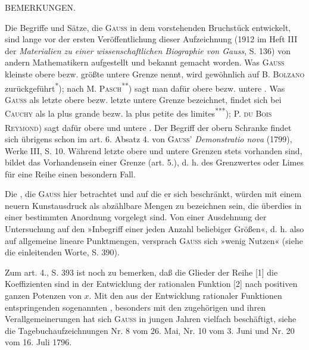 \clearpage{}
\begin{center}BEMERKUNGEN.\end{center}
\noindent\hspace*{\parindent}Die Begriffe und Sätze, die \textsc{Gauss} in dem vorstehenden Bruchstück entwickelt, sind lange vor der ersten Veröffentlichung dieser Aufzeichnung (1912 im Heft III der \textit{Materialien zu einer wissenschaftlichen Biographie von Gauss}, S. 136) von andern Mathematikern aufgestellt und bekannt gemacht worden. Was \textsc{Gauss} kleinste obere bezw. größte untere Grenze nennt, wird gewöhnlich auf B. \textsc{Bolzano} zurückgeführt\textsuperscript{*}); nach M. \textsc{Pasch}\textsuperscript{**}) sagt man dafür obere bezw. untere . Was \textsc{Gauss} als letzte obere bezw. letzte untere Grenze bezeichnet, findet sich bei \textsc{Cauchy} als la plus grande bezw. la plus petite des limites\textsuperscript{***}); P. \textsc{du Bois Reymond}\textsuperscript{\dag}) sagt dafür obere und untere . Der Begriff der obern Schranke findet sich übrigens schon im art. 6. Absatz 4. von \textsc{Gauss}' \textit{Demonstratio nova} (1799), Werke III, S. 10. Während letzte obere und untere Grenzen stets vorhanden sind, bildet das Vorhandensein einer  Grenze (art. 5.), d. h. des Grenzwertes oder Limes für eine Reihe einen besondern Fall.

Die , die \textsc{Gauss} hier betrachtet und auf die er sich  beschränkt, würden mit einem neuern Kunstausdruck als abzählbare Mengen zu bezeichnen sein, die überdies in einer bestimmten Anordnung vorgelegt sind. Von einer Ausdehnung der Untersuchung auf den »Inbegriff einer jeden Anzahl beliebiger Größen«, d. h. also auf allgemeine lineare Punktmengen, versprach \textsc{Gauss} sich »wenig Nutzen« (siehe die einleitenden Worte, S. 390).

Zum art. 4., S. 393 ist noch zu bemerken, daß die Glieder der Reihe [1] die Koeffizienten sind in der Entwicklung der rationalen Funktion [2] nach positiven ganzen Potenzen von \(x\). Mit den aus der Entwicklung rationaler Funktionen entspringenden sogenannten , besonders mit den zugehörigen  und ihren Verallgemeinerungen hat sich \textsc{Gauss} in jungen Jahren vielfach beschäftigt, siehe die Tagebuchaufzeichnungen Nr. 8 vom 26. Mai, Nr. 10 vom 3. Juni und Nr. 20 vom 16. Juli 1796.

